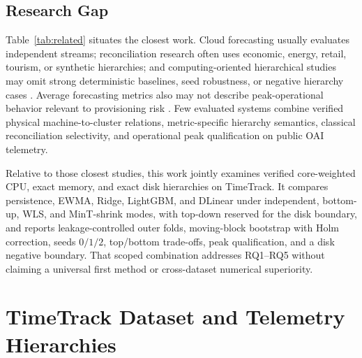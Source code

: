 \documentclass[a4paper,fleqn]{cas-dc}
\begin{document}
\subsection{Research Gap}
Table~\ref{tab:related} situates the closest work.
Cloud forecasting usually evaluates independent streams; reconciliation research
often uses economic, energy, retail, tourism, or synthetic hierarchies; and
computing-oriented hierarchical studies may omit strong deterministic baselines,
seed robustness, or negative hierarchy cases
\cite{masdari2020workload,athanasopoulos2024hierarchical,harmony2024,wang2025frt}.
Average forecasting metrics also may not describe peak-operational behavior
relevant to provisioning risk
\cite{agullo2025spikes,sus2024signature}.
Few evaluated systems combine verified physical machine-to-cluster relations,
metric-specific hierarchy semantics, classical reconciliation selectivity, and
operational peak qualification on public {OAI} telemetry.

Relative to those closest studies, this work jointly examines verified
core-weighted {CPU}, exact memory, and exact disk hierarchies on TimeTrack.
It compares persistence, {EWMA}, Ridge, LightGBM, and DLinear under independent,
bottom-up, {WLS}, and MinT-shrink modes, with top-down reserved for the disk
boundary, and reports leakage-controlled outer folds, moving-block bootstrap
with Holm correction, seeds $0/1/2$, top/bottom trade-offs, peak qualification,
and a disk negative boundary.
That scoped combination addresses {RQ1}--{RQ5} without claiming a universal first
method or cross-dataset numerical superiority.



\section{TimeTrack Dataset and Telemetry Hierarchies}
\label{sec:dataset}
\end{document}
